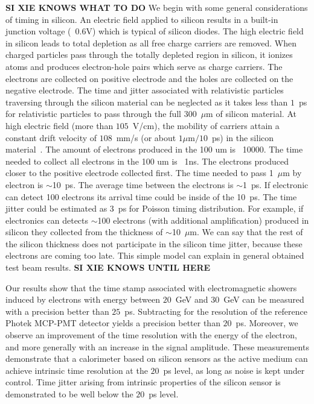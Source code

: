 \documentclass[12pt]{article}
\begin{document}
{\textbf{SI XIE KNOWS WHAT TO DO} We begin with some general considerations of timing in silicon.
An electric field applied to silicon results in a built-in junction voltage
(~0.6V) which is typical of silicon diodes. The high electric field in silicon
leads to total depletion as all free charge carriers are removed. 
When charged particles pass through the totally depleted region in silicon, 
it ionizes atoms and produces electron-hole pairs which serve as charge carriers.
The electrons are collected on positive electrode and the holes are collected
on the negative electrode. The time and jitter associated with relativistic particles 
traversing through the silicon material can be neglected as it takes 
less than $1$~ps for relativistic particles to pass through the full $300$~$\mu$m
of silicon material. At high electric field (more than $105$~V/cm), the mobility 
of carriers attain a constant drift velocity of $108$~mm/s 
(or about $1\mu$m$/10$~ps) in the silicon material~\cite{Ronzhin2015}. 
The amount of electrons produced in the 100 um is ~10000. The
time needed to collect all electrons in the 100 um is ~1ns. The electrons produced closer to 
the positive electrode collected first. The time needed to pass 1~$\mu$m by electron 
is $\sim$10~ps. The average time between the
electrons is $\sim$1~ps. If electronic can detect 100 electrons its arrival time
could be inside of the 10~ps. The time jitter could be estimated as 3~ps for
Poisson timing distribution. For example, if electronics can detects $\sim$100
electrons (with additional amplification) produced in silicon they collected
from the thickness of $\sim$10~$\mu$m. We can say that the rest of the silicon
thickness does not participate in the silicon time jitter, because these
electrons are coming too late. This simple model can explain in general
obtained test beam results. \textbf{SI XIE KNOWS UNTIL HERE} 


Our results show that the time stamp associated with electromagnetic 
showers induced by electrons with energy between $20$~GeV and $30$~GeV 
can be measured with a precision better than $25$~ps. Subtracting for the resolution
of the reference Photek MCP-PMT detector yields a precision better than $20$~ps. 
Moreover, we observe an improvement of the time resolution with the energy of 
the electron, and more generally with an increase in the signal amplitude. 
These measurements demonstrate that a calorimeter based on silicon sensors as
the active medium can achieve intrinsic time resolution at the $20$~ps level, as long
as noise is kept under control. Time jitter arising from intrinsic properties of the
silicon sensor is demonstrated to be well below the $20$~ps level.

}
\end{document}
